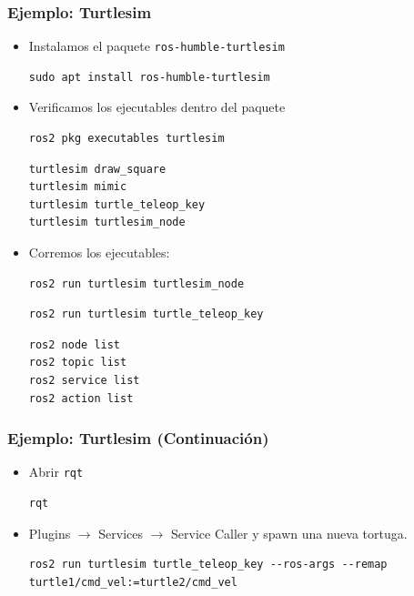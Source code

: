 \begin{frame}[fragile]
    \frametitle{Ejemplo: Turtlesim}
    \scriptsize
    \begin{itemize}

        \item Instalamos el paquete \lstinline[style=bash]{ros-humble-turtlesim}
        \begin{lstlisting}[style=bash]
sudo apt install ros-humble-turtlesim
        \end{lstlisting}
        \item Verificamos los ejecutables dentro del paquete
        \begin{lstlisting}[style=bash]
ros2 pkg executables turtlesim
        \end{lstlisting}
        \begin{lstlisting}[style=bash]
turtlesim draw_square
turtlesim mimic
turtlesim turtle_teleop_key
turtlesim turtlesim_node
        \end{lstlisting}
        \item Corremos los ejecutables:
        \begin{lstlisting}[style=bash]
ros2 run turtlesim turtlesim_node
        \end{lstlisting}

        \begin{lstlisting}[style=bash]
ros2 run turtlesim turtle_teleop_key
        \end{lstlisting}
        \begin{lstlisting}[style=bash]
ros2 node list
ros2 topic list
ros2 service list
ros2 action list
        \end{lstlisting}
    \end{itemize}    
\end{frame}

\begin{frame}[fragile]
	\frametitle{Ejemplo: Turtlesim (Continuación)}
    
    \begin{itemize}
        \item Abrir \lstinline[style=bash]{rqt}
        \begin{lstlisting}[style=bash]    
rqt
        \end{lstlisting}
        \item Plugins $\rightarrow$ Services $\rightarrow$ Service Caller y spawn una nueva tortuga.
        
        \footnotesize
        \begin{lstlisting}[style=bash]    
            ros2 run turtlesim turtle_teleop_key --ros-args --remap turtle1/cmd_vel:=turtle2/cmd_vel
        \end{lstlisting}
    \end{itemize}


\end{frame}

